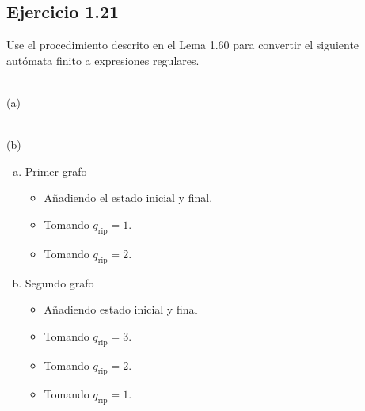 \documentclass{article}
\begin{document}
\subsection*{Ejercicio 1.21}
Use el procedimiento descrito en el Lema 1.60 para convertir el siguiente autómata finito a expresiones regulares.
\begin{multicols}{2}
\begin{center}
\\
(a)\phantom{M}
\end{center}

\begin{center}
\\
(b)\phantom{M}
\end{center}
\end{multicols}
\begin{enumerate}[a)]
    \item Primer grafo
    \begin{itemize}
        \item Añadiendo el estado inicial y final.
        
        \item Tomando $q_{\text{rip}}=1$.
        
        \item Tomando $q_{\text{rip}}=2$.
        
    \end{itemize}
    
    \item Segundo grafo
    \begin{itemize}
        \item Añadiendo estado inicial y final
        
        \item Tomando $q_{\text{rip}}=3$.
        
        \item Tomando $q_{\text{rip}}=2$.
        
        \item Tomando $q_{\text{rip}}=1$.
        
    \end{itemize}
\end{enumerate}
\end{document}
